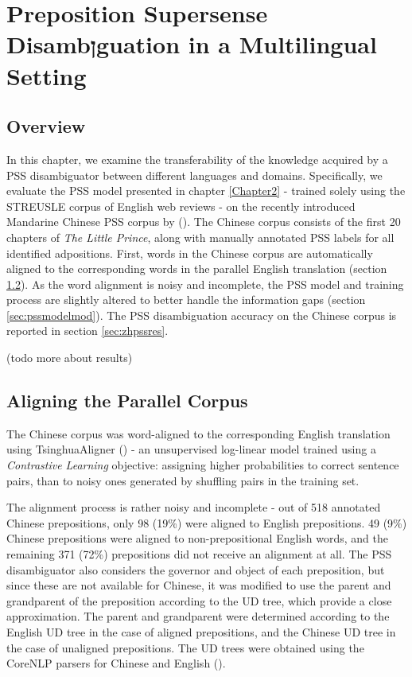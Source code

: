 
\chapter{Preposition Supersense Disambןguation in a Multilingual Setting } %

\label{Chapter4} %

\section{Overview}

In this chapter, we examine the transferability of the knowledge acquired by a PSS disambiguator between different languages and domains. Specifically, we evaluate the PSS model presented in chapter \ref{Chapter2} - trained solely using the STREUSLE corpus of English web reviews - on the recently introduced Mandarine Chinese PSS corpus by (\cite{chinesecorpus}). The Chinese corpus consists of the first 20 chapters of \textit{The Little Prince}, along with manually annotated PSS labels for all identified adpositions. First, words in the Chinese corpus are automatically aligned to the corresponding words in the parallel English translation (section \ref{sec:chinesecorpus}). As the word alignment is noisy and incomplete, the PSS model and training process are slightly altered to better handle the information gaps (section \ref{sec:pssmodelmod}). The PSS disambiguation accuracy on the Chinese corpus is reported in section \ref{sec:zhpssres}.

(todo more about results)

\section{Aligning the Parallel Corpus} \label{sec:chinesecorpus}

The Chinese corpus was word-aligned to the corresponding English translation using TsinghuaAligner (\cite{liu2014contrastive}) - an unsupervised log-linear model trained using a \textit{Contrastive Learning} objective: assigning higher probabilities to correct sentence pairs, than to noisy ones generated by shuffling pairs in the training set. 

The alignment process is rather noisy and incomplete - out of 518 annotated Chinese prepositions, only 98 (19\%) were aligned to English prepositions. 49 (9\%) Chinese prepositions were aligned to non-prepositional English words, and the remaining 371 (72\%) prepositions did not receive an alignment at all. The PSS disambiguator also considers the governor and object of each preposition, but since these are not available for Chinese, it was modified to use the parent and grandparent of the preposition according to the UD tree, which provide a close approximation. The parent and grandparent were determined according to the English UD tree in the case of aligned prepositions, and the Chinese UD tree in the case of unaligned prepositions. The UD trees were obtained using the CoreNLP parsers for Chinese and English (\cite{manning14stanford}). 


